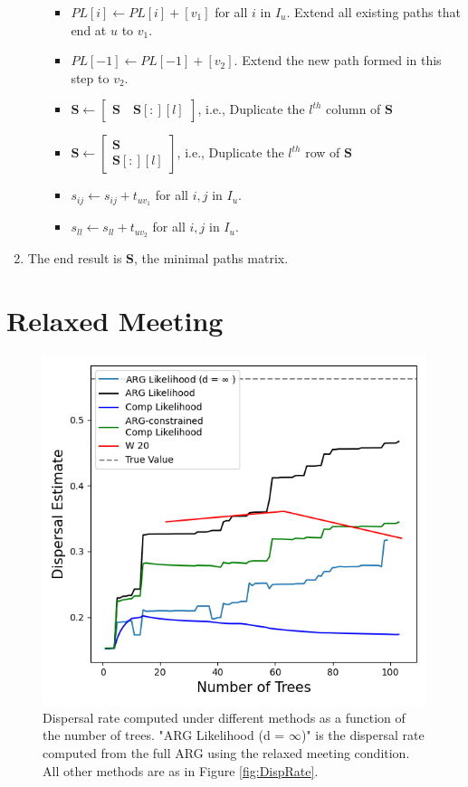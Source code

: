 \begin{enumerate}
\begin{enumerate}
\begin{itemize}
                \item $PL[i] \leftarrow PL[i] + [v_1]$ for all $i$ in $I_u$. Extend all existing paths that end at $u$ to $v_1$.
                \item $PL[-1] \leftarrow PL[-1] + [v_2]$. Extend the new path formed in this step to $v_2$. 
                \item $\mathbf{S} \leftarrow \begin{bmatrix}
                    \mathbf{S} \quad \mathbf{S}[:][l] \end{bmatrix}  $, i.e., Duplicate the $l^{th}$ column of $\mathbf{S}$
                \item $\mathbf{S} \leftarrow \begin{bmatrix}
                    \mathbf{S} \\
                    \mathbf{S}[:][l]
                \end{bmatrix}$, i.e., Duplicate the $l^{th}$ row of $\mathbf{S}$
                \item $s_{ij} \leftarrow s_{ij} + t_{uv_1}$ for all $i,j$ in $I_u$.
                \item $s_{ll} \leftarrow s_{ll} + t_{uv_2}$ for all $i,j$ in $I_u$.
            \end{itemize}
    \end{enumerate}
    \item The end result is $\mathbf{S}$, the minimal paths matrix.
\end{enumerate}

\section{Relaxed Meeting} 

\begin{figure}[h]
    \centering
    \includegraphics[width=0.75\linewidth]{Images/SupplementaryFigures/DispersalRateMethods/S_DispersalRate_Inf.png}
    \caption{Dispersal rate computed under different methods as a function of the number of trees. "ARG Likelihood (d = $\infty$)" is the dispersal rate computed from the full ARG using the relaxed meeting condition. All other methods are as in Figure \ref{fig:DispRate}.}
    \label{fig:S_DispersalRate}
\end{figure}

